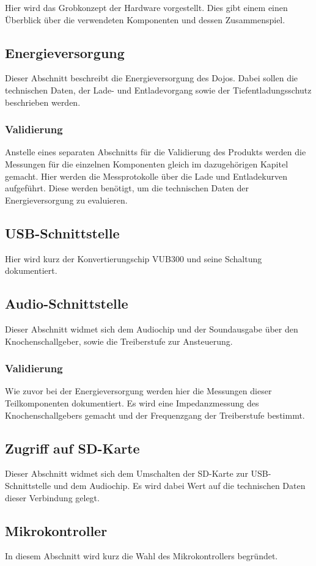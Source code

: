 Hier wird das Grobkonzept der Hardware vorgestellt. Dies gibt einem einen Überblick über die verwendeten Komponenten und dessen Zusammenspiel.

\subsection{Energieversorgung}
Dieser Abschnitt beschreibt die Energieversorgung des Dojos. Dabei sollen die technischen Daten, der Lade- und Entladevorgang sowie der Tiefentladungsschutz beschrieben werden.

\subsubsection{Validierung}
Anstelle eines separaten Abschnitts für die Validierung des Produkts werden die Messungen für die einzelnen Komponenten gleich im dazugehörigen Kapitel gemacht. Hier werden die Messprotokolle über die Lade und Entladekurven aufgeführt. Diese werden benötigt, um die technischen Daten der Energieversorgung zu evaluieren.

\subsection{USB-Schnittstelle}
Hier wird kurz der Konvertierungschip VUB300 und seine Schaltung dokumentiert.

\subsection{Audio-Schnittstelle}
Dieser Abschnitt widmet sich dem Audiochip und der Soundausgabe über den Knochenschallgeber, sowie die Treiberstufe zur Ansteuerung.

\subsubsection{Validierung}
Wie zuvor bei der Energieversorgung werden hier die Messungen dieser Teilkomponenten dokumentiert. Es wird eine Impedanzmessung des Knochenschallgebers gemacht und der Frequenzgang der Treiberstufe bestimmt.

\subsection{Zugriff auf SD-Karte}
Dieser Abschnitt widmet sich dem Umschalten der SD-Karte zur USB-Schnittstelle und dem Audiochip. Es wird dabei Wert auf die technischen Daten dieser Verbindung gelegt.

\subsection{Mikrokontroller}
In diesem Abschnitt wird kurz die Wahl des Mikrokontrollers begründet.